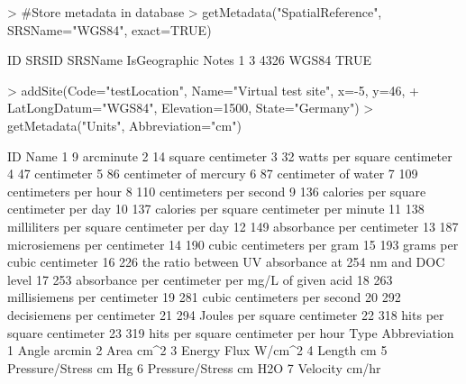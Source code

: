 \documentclass[a4paper]{article}
\begin{document}
\begin{Schunk}
\begin{Sinput}
> #Store metadata in database
> getMetadata("SpatialReference", SRSName="WGS84", exact=TRUE)
\end{Sinput}
\begin{Soutput}
  ID SRSID SRSName IsGeographic Notes
1  3  4326   WGS84         TRUE      
\end{Soutput}
\begin{Sinput}
> addSite(Code="testLocation", Name="Virtual test site", x=-5, y=46,
+ 	LatLongDatum="WGS84", Elevation=1500, State="Germany")
> getMetadata("Units", Abbreviation="cm")
\end{Sinput}
\begin{Soutput}
    ID                                                    Name
1    9                                               arcminute
2   14                                       square centimeter
3   32                             watts per square centimeter
4   47                                           centimeter   
5   86                                   centimeter of mercury
6   87                                     centimeter of water
7  109                                    centimeters per hour
8  110                                  centimeters per second
9  136                  calories per square centimeter per day
10 137               calories per square centimeter per minute
11 138               milliliters per square centimeter per day
12 149                               absorbance per centimeter
13 187                             microsiemens per centimeter
14 190                              cubic centimeters per gram
15 193                              grams per cubic centimeter
16 226 the ratio between UV absorbance at 254 nm and DOC level
17 253       absorbance per centimeter per mg/L of given acid 
18 263                             millisiemens per centimeter
19 281                            cubic centimeters per second
20 292                              decisiemens per centimeter
21 294                            Joules per square centimeter
22 318                              hits per square centimeter
23 319                     hits per square centimeter per hour
                      Type  Abbreviation
1                    Angle        arcmin
2                     Area          cm^2
3              Energy Flux        W/cm^2
4                   Length            cm
5          Pressure/Stress         cm Hg
6          Pressure/Stress        cm H2O
7                 Velocity         cm/hr

\end{Soutput}
\end{Schunk}
\end{document}
